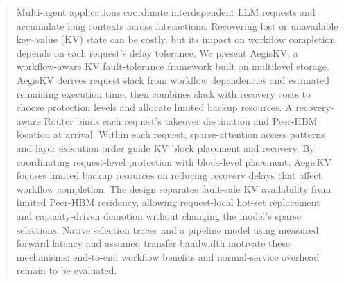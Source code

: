 \begin{abstract}
Multi-agent applications coordinate interdependent LLM requests and
accumulate long contexts across interactions. Recovering lost or
unavailable key--value (KV) state can be costly, but its impact on workflow
completion depends on each request's delay tolerance. We present AegisKV,
a workflow-aware KV fault-tolerance framework built on multilevel storage.
AegisKV derives request slack from workflow dependencies and estimated
remaining execution time, then combines slack with recovery costs to
choose protection levels and allocate limited backup resources.
A recovery-aware Router binds each request's takeover
destination and Peer-HBM location at arrival. Within each request,
sparse-attention access patterns and layer execution order
guide KV block placement and recovery. By coordinating request-level
protection with block-level placement, AegisKV focuses limited backup
resources on reducing recovery delays that affect workflow completion.
The design separates fault-safe KV availability from limited Peer-HBM
residency, allowing request-local hot-set replacement and capacity-driven
demotion without changing the model's sparse selections. Native selection
traces and a pipeline model using measured forward latency and assumed
transfer bandwidth motivate these mechanisms;
end-to-end workflow benefits and normal-service overhead remain to be evaluated.
\end{abstract}
